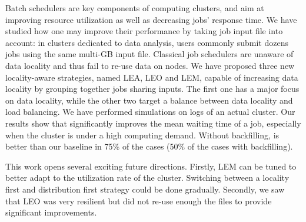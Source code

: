 \documentclass[sigconf,review,anonymous]{acmart}
\newcommand{\rev}[1]{{\color{blue}{#1}}}
\begin{document}
Batch schedulers are key components of computing clusters, and aim at
improving resource utilization as well as decreasing jobs' response
time. We have studied how one may improve their performance by taking
job input file into account: in clusters dedicated to data analysis,
users commonly submit dozens jobs using the same multi-GB input
file. Classical job schedulers are unaware of data locality and thus
fail to re-use data on nodes. We have proposed three new locality-aware
strategies, named LEA, LEO and LEM,
capable of increasing data locality by grouping together 
jobs sharing inputs. The first one has a major focus on data locality,
while the other two target a balance between data locality and load
balancing. We have performed simulations on logs of an actual
cluster. Our results show that \rev{LEA} significantly improves the mean
waiting time of a job, especially  
when the cluster is under a high computing demand.
Without backfilling, \rev{LEA} is better than our baseline in 75\% of the
cases (50\% of the cases with backfilling).
\rev{Our strategy call LEM is the best compromise. It's better than the baseline in more than 75\% of the cases with or without backfilling.}

This work opens several exciting future directions.
Firstly, LEM can be tuned to better adapt to the utilization rate of the cluster.
Switching between a locality first and distribution first strategy could be done 
gradually.
Secondly, we saw that LEO was very resilient but did not re-use enough the files to provide significant improvements.
\rev{
An extension towards workflow scheduling where tasks depend on the output of a previous task would be great.
Indeed the output file in memory would be re-usable for other jobs, which is a 
new opportunity for locality-aware schedulers.
In the long run, our objective is to consider others issues raised by batch scheduling like
improving fairness between users, or dealing with advance reservations.
Lastly, we want to implement our strategies on the real cluster
to test their robustness in real world situations.
}



\end{document}
